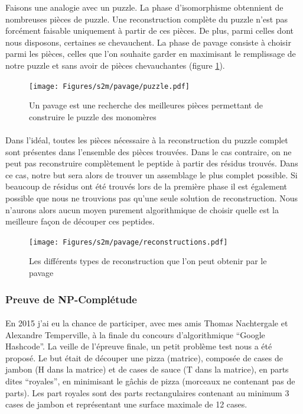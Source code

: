 \documentclass[12pt,french,twoside]{report}
\begin{document}
Faisons une analogie avec un puzzle. La phase d'isomorphisme obtennient de nombreuses pièces de puzzle.
Une reconstruction complète du puzzle n'est pas forcément faisable uniquement à partir de ces pièces.
De plus, parmi celles dont nous disposons, certaines se chevauchent.
La phase de pavage consiste à choisir parmi les pièces, celles que l'on souhaite garder en maximisant le remplissage de notre puzzle et sans avoir de pièces chevauchantes (figure \ref{puzzle}).

\begin{figure}
  \texttt{[image: Figures/s2m/pavage/puzzle.pdf]}
  \caption{\label{puzzle}Un pavage est une recherche des meilleures pièces permettant de construire le puzzle des monomères}
\end{figure}

\paragraph{}Dans l'idéal, toutes les pièces nécessaire à la reconstruction du puzzle complet sont présentes dans l'ensemble des
pièces trouvées. Dans le cas contraire, on ne peut pas reconstruire complètement le peptide à partir des résidus trouvés. 
Dans ce cas, notre
but sera alors de trouver un assemblage le plus complet possible. Si beaucoup de résidus ont été trouvés lors de la première phase
il est également possible que nous ne trouvions pas qu'une seule solution de reconstruction. Nous n'aurons alors aucun moyen
purement algorithmique de choisir quelle est la meilleure façon de découper ces peptides.

\begin{figure}
  \texttt{[image: Figures/s2m/pavage/reconstructions.pdf]}
  \caption{\label{reconstruction}Les différents types de reconstruction que l'on peut obtenir par le pavage}
\end{figure}


\subsubsection{Preuve de NP-Complétude}

\paragraph{}En 2015 j'ai eu la chance de participer, avec mes amis Thomas Nachtergale et Alexandre Temperville, à la finale du concours d'algorithmique ``Google Hashcode''.
La veille de l'épreuve finale, un petit problème test nous a été proposé.
Le but était de découper une pizza (matrice), composée de cases de jambon (H dans la matrice) et de cases de sauce (T dans la matrice), en parts dites ``royales'', en minimisant le gâchis de pizza (morceaux ne contenant pas de parts).
Les part royales sont des parts rectangulaires contenant au minimum 3 cases de jambon et représentant une surface maximale de 12 cases.
\end{document}
